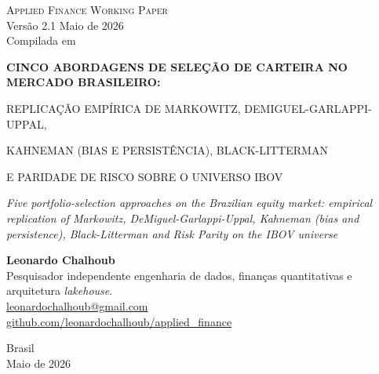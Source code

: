 \documentclass[12pt,a4paper,oneside]{article}
\begin{document}
\begin{titlepage}
  \begin{center}
    \vspace*{1.5cm}
    {\small\textsc{Applied Finance \quad\textbar\quad Working Paper}}\\
    {\small Versão 2.1 \textemdash{} Maio de 2026}\\[2pt]
    {\footnotesize Compilada em \COMPILESTAMP\ \textbullet\ \texttt{\COMPILESHA}}

    \vfill

    {\LARGE\bfseries
     CINCO ABORDAGENS DE SELEÇÃO DE CARTEIRA NO MERCADO BRASILEIRO:

     REPLICAÇÃO EMPÍRICA DE MARKOWITZ, DEMIGUEL-GARLAPPI-UPPAL,

     KAHNEMAN (BIAS E PERSISTÊNCIA), BLACK-LITTERMAN

     E PARIDADE DE RISCO SOBRE O UNIVERSO IBOV}

    \vspace{1cm}
    {\large\itshape
     Five portfolio-selection approaches on the Brazilian equity market:
     empirical replication of Markowitz, DeMiguel-Garlappi-Uppal,
     Kahneman (bias and persistence), Black-Litterman and Risk Parity
     on the IBOV universe}

    \vfill

    {\large\textbf{Leonardo Chalhoub}}\\[4pt]
    {\small Pesquisador independente \textemdash{} engenharia de dados,
     finanças quantitativas e arquitetura \textit{lakehouse}.}\\[2pt]
    {\small\href{mailto:leonardochalhoub@gmail.com}{leonardochalhoub@gmail.com}}\\
    {\small\href{https://github.com/leonardochalhoub/applied\_finance}{github.com/leonardochalhoub/applied\_finance}}

    \vfill

    {\small Brasil \\ Maio de 2026}
  \end{center}
\end{titlepage}

\end{document}
